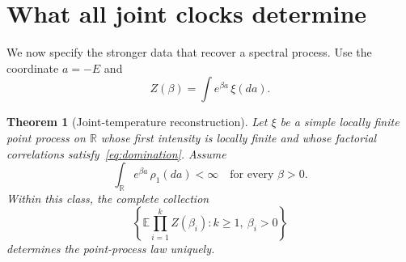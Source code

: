 \documentclass[11pt,a4paper]{article}
\newtheorem{theorem}{Theorem}[section]
\theoremstyle{remark}\newtheorem{remark}[theorem]{Remark}
\newcommand{\E}{\mathbb E}
\newcommand{\R}{\mathbb R}
\begin{document}
\section{What all joint clocks determine}\label{sec:reconstruct}
We now specify the stronger data that recover a spectral process.
Use the coordinate $a=-E$ and
\begin{equation}
 Z(\beta)=\int e^{\beta a}\,\xi(da).
\end{equation}
\begin{theorem}[Joint-temperature reconstruction]\label{thm:reconstruction}
Let $\xi$ be a simple locally finite point process on $\R$ whose first intensity is locally finite and whose factorial correlations satisfy~\eqref{eq:domination}.
Assume
\begin{equation}\label{eq:lapfinite}
 \int_\R e^{\beta a}\,\rho_1(da)<\infty
 \quad\text{for every }\beta>0.
\end{equation}
Within this class, the complete collection
\begin{equation}\label{eq:jointdata}
 \left\{\E\prod_{i=1}^k Z(\beta_i):k\ge1,\ \beta_i>0\right\}
\end{equation}
determines the point-process law uniquely.
\end{theorem}
\end{document}
